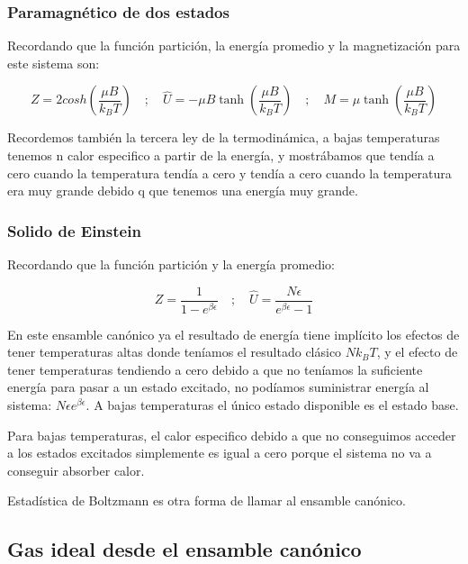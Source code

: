 \documentclass[11pt,fleqn]{book}
\begin{document}
\subsubsection{Paramagnético de dos estados}

Recordando que la función partición, la energía promedio y la magnetización para este sistema son:

\begin{equation*}
    Z=2cosh\left(\frac{\mu B}{k_{B}T}\right)\quad;\quad\hat{U}=-\mu B\tanh{\left(\frac{\mu B}{k_{B}T}\right)}\quad;\quad M=\mu\tanh{\left(\frac{\mu B}{k_{B}T}\right)}
\end{equation*}

Recordemos también la tercera ley de la termodinámica, a bajas temperaturas tenemos n calor especifico a partir de la energía, y mostrábamos que tendía a cero cuando la temperatura tendía a cero y tendía a cero cuando la temperatura era muy grande debido q que tenemos una energía muy grande.

\subsubsection{Solido de Einstein}

Recordando que la función partición y la energía promedio:

\begin{equation*}
    Z=\frac{1}{1-e^{\beta\epsilon}}\quad;\quad\hat{U}=\frac{N\epsilon}{e^{\beta\epsilon}-1}
\end{equation*}

En este ensamble canónico ya el resultado de energía tiene implícito los efectos de tener temperaturas altas donde teníamos el resultado clásico $Nk_{B}T$, y el efecto de tener temperaturas tendiendo a cero debido a que no teníamos la suficiente energía para pasar a un estado excitado, no podíamos suministrar energía al sistema: $N\epsilon e^{\beta\epsilon}$. A bajas temperaturas el único estado disponible es el estado base.

Para bajas temperaturas, el calor especifico debido a que no conseguimos acceder a los estados excitados simplemente es igual a cero porque el sistema no va a conseguir absorber calor.

\begin{remark}
    Estadística de Boltzmann es otra forma de llamar al ensamble canónico. 
\end{remark}

\subsection{Gas ideal desde el ensamble canónico}
\end{document}
